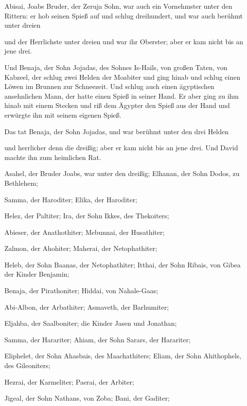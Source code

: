  Abisai, Joabs Bruder, der Zeruja Sohn, war auch ein
Vornehmster unter den Rittern: er hob seinen Spieß auf und schlug
dreihundert, und war auch berühmt unter dreien

 und der Herrlichste unter dreien und war ihr Oberster;
aber er kam nicht bis an jene drei.

 Und Benaja, der Sohn Jojadas, des Sohnes Is-Hails, von
großen Taten, von Kabzeel, der schlug zwei Helden der Moabiter und ging
hinab und schlug einen Löwen im Brunnen zur Schneezeit. 
Und schlug auch einen ägyptischen ansehnlichen Mann, der hatte einen
Spieß in seiner Hand. Er aber ging zu ihm hinab mit einem Stecken und
riß dem Ägypter den Spieß aus der Hand und erwürgte ihn mit seinem
eigenen Spieß.

 Das tat Benaja, der Sohn Jojadas, und war berühmt unter
den drei Helden

 und herrlicher denn die dreißig; aber er kam nicht bis an
jene drei. Und David machte ihn zum heimlichen Rat.

 Asahel, der Bruder Joabs, war unter den dreißig; Elhanan,
der Sohn Dodos, zu Bethlehem;

 Samma, der Haroditer; Elika, der Haroditer;

 Helez, der Paltiter; Ira, der Sohn Ikkes, des Thekoiters;

 Abieser, der Anathothiter; Mebunnai, der Husathiter;

 Zalmon, der Ahohiter; Maherai, der Netophathiter;

 Heleb, der Sohn Baanas, der Netophathiter; Itthai, der
Sohn Ribais, von Gibea der Kinder Benjamin;

 Benaja, der Pirathoniter; Hiddai, von Nahale-Gaas;

 Abi-Albon, der Arbathiter; Asmaveth, der Barhumiter;

 Eljahba, der Saalboniter; die Kinder Jasen und Jonathan;

 Samma, der Harariter; Ahiam, der Sohn Sarars, der
Harariter;

 Eliphelet, der Sohn Ahasbais, des Maachathiters; Eliam,
der Sohn Ahithophels, des Gileoniters;

 Hezrai, der Karmeliter; Paerai, der Arbiter;

 Jigeal, der Sohn Nathans, von Zoba; Bani, der Gaditer;

